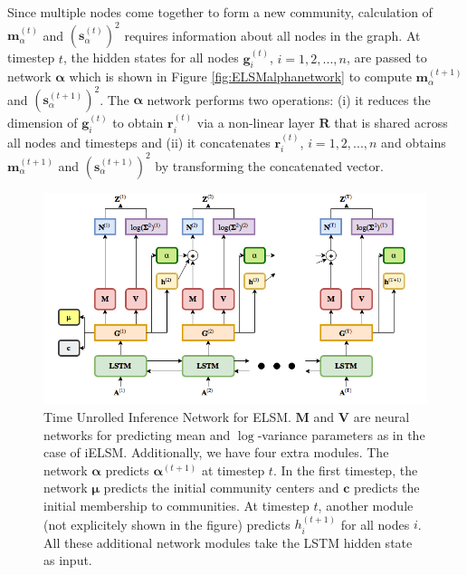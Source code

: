 \documentclass[letterpaper]{article} %
\begin{document}
Since multiple nodes come together to form a new community, calculation of $\mathbf{m}^{(t)}_{\alpha}$ and $(\mathbf{s}^{(t)}_{\alpha})^2$ requires information about all nodes in the graph. At timestep $t$, the hidden states for all nodes $\mathbf{g}_i^{(t)}$, $i = 1, 2, ..., {n}$, are passed to network $\bm{\alpha}$ which is shown in Figure \ref{fig:ELSMalphanetwork} to compute $\mathbf{m}^{(t+1)}_{\alpha}$ and $(\mathbf{s}^{(t+1)}_{\alpha})^2$. The $\bm{\alpha}$ network performs two operations: (i) it reduces the dimension of $\mathbf{g}_i^{(t)}$ to obtain $\mathbf{r}_i^{(t)}$ via a non-linear layer $\mathbf{R}$ that is shared across all nodes and timesteps and (ii) it concatenates $\mathbf{r}_i^{(t)}$, $i = 1, 2, ..., {n}$ and obtains $\mathbf{m}^{(t+1)}_{\alpha}$ and $(\mathbf{s}^{(t+1)}_{\alpha})^2$ by transforming the concatenated vector. 

\begin{figure}
\begin{center}
\centering
\includegraphics[width=\textwidth]{network_model_elsm}
\caption{Time Unrolled Inference Network for ELSM. $\mathbf{M}$ and $\mathbf{V}$ are neural networks for predicting mean and $\log$-variance parameters as in the case of iELSM. Additionally, we have four extra modules. The network $\bm{\alpha}$ predicts $\bm{\alpha}^{(t + 1)}$ at timestep $t$. In the first timestep, the network $\bm{\mu}$ predicts the initial community centers and $\mathbf{c}$ predicts the initial membership to communities. At timestep $t$, another module (not explicitely shown in the figure) predicts $h^{(t + 1)}_i$ for all nodes $i$. All these additional network modules take the LSTM hidden state as input.}
\label{fig:ELSMnetworkmodel}
\end{center}
\end{figure}
\end{document}
